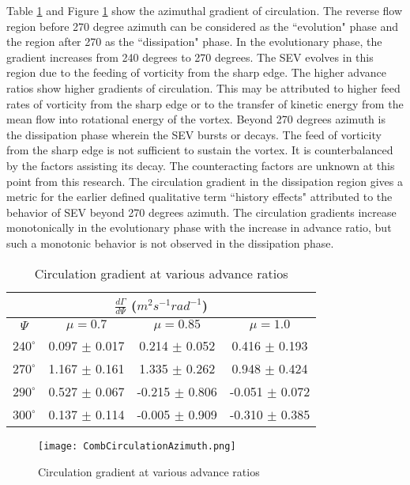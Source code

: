 \documentclass[%
 reprint,
 showkeys,
 amsmath,amssymb,
 aps,
]{revtex4-1}
\begin{document}
Table \ref{Tab:CirculationGradient} and Figure \ref{CirculationAzimuth} show the azimuthal gradient of circulation. The reverse flow region before 270 degree azimuth can be considered as the ``evolution" phase and the region after 270 as the ``dissipation" phase. In the evolutionary phase, the gradient increases from 240 degrees to 270 degrees. The SEV evolves in this region due to the feeding of vorticity from the sharp edge. The higher advance ratios show higher gradients of circulation. This may be attributed to higher feed rates of vorticity from the sharp edge or to the transfer of kinetic energy from the mean flow into rotational energy of the vortex. Beyond 270 degrees azimuth is the dissipation phase wherein the SEV bursts or decays. The feed of vorticity from the sharp edge is not sufficient to sustain the vortex. It is counterbalanced by the factors assisting its decay. The counteracting factors are unknown at this point from this research. The circulation gradient in the dissipation region gives a metric for the earlier defined qualitative term ``history effects" attributed to the behavior of SEV beyond 270 degrees azimuth. The circulation gradients increase monotonically in the evolutionary phase with the increase in advance ratio, but such a monotonic behavior is not observed in the dissipation phase.      

\begin{table}[!ht]
	\centering
	\caption{Circulation gradient at various advance ratios}
	\begin{tabular}{ |c||c|c|c|  }
		\hline
       \multicolumn{4}{|c|}{$\frac{d\Gamma}{d\Psi}$ ($m^2s^{-1}rad^{-1}$)} \\
		\hline
		$\Psi$ & $\mu=0.7$ & $\mu=0.85$ & $\mu=1.0$ \\
		\hline
		$240^{\circ}$  & 0.097 $\pm$ 0.017 & 0.214 $\pm$ 0.052 & 0.416 $\pm$ 0.193  \\
		$270^{\circ}$  & 1.167 $\pm$ 0.161 & 1.335 $\pm$ 0.262 & 0.948 $\pm$ 0.424 \\
		$290^{\circ}$  & 0.527 $\pm$ 0.067 & -0.215 $\pm$ 0.806 & -0.051 $\pm$ 0.072 \\
		$300^{\circ}$  & 0.137 $\pm$ 0.114 & -0.005 $\pm$ 0.909 & -0.310 $\pm$ 0.385  \\
		\hline
	\end{tabular}
	
	\label{Tab:CirculationGradient}
\end{table}

\begin{figure}[!ht]
	\texttt{[image: CombCirculationAzimuth.png]} 
	\caption{Circulation gradient at various advance ratios}
	\label{CirculationAzimuth}
	
\end{figure}
\end{document}
